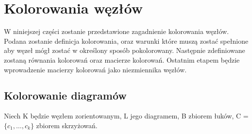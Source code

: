 \section{Kolorowania węzłów}
W niniejszej części zostanie przedstawione zagadnienie kolorowania węzłów. Podana zostanie definicja kolorowania, oraz warunki które muszą zostać spełnione aby węzeł mógł zostać w określony sposób pokolorowany. Następnie zdefiniowane zostaną równania kolorowań oraz macierze kolorowań. Ostatnim etapem będzie wprowadzenie macierzy kolorowań jako niezmiennika węzłów. 

\subsection{Kolorowanie diagramów}

Niech K będzie węzłem zorientowanym, L jego diagramem, B zbiorem łuków,  C = $\lbrace c_{1}, \ldots, c_{k}\rbrace$ zbiorem skrzyżowań. 

